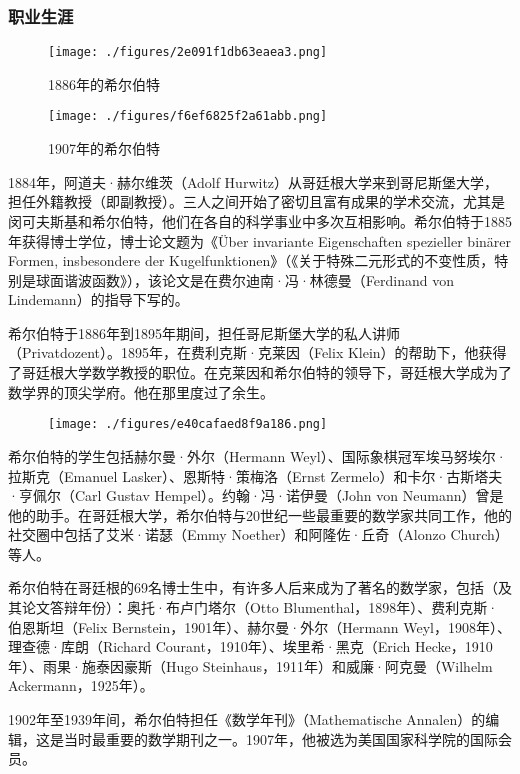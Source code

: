 \subsubsection{职业生涯}
\begin{figure}[ht]
\centering
\texttt{[image: ./figures/2e091f1db63eaea3.png]}
\caption{1886年的希尔伯特} \label{fig_David_2}
\end{figure}
\begin{figure}[ht]
\centering
\texttt{[image: ./figures/f6ef6825f2a61abb.png]}
\caption{1907年的希尔伯特} \label{fig_David_3}
\end{figure}
1884年，阿道夫·赫尔维茨（Adolf Hurwitz）从哥廷根大学来到哥尼斯堡大学，担任外籍教授（即副教授）。三人之间开始了密切且富有成果的学术交流，尤其是闵可夫斯基和希尔伯特，他们在各自的科学事业中多次互相影响。希尔伯特于1885年获得博士学位，博士论文题为《Über invariante Eigenschaften spezieller binärer Formen, insbesondere der Kugelfunktionen》（《关于特殊二元形式的不变性质，特别是球面谐波函数》），该论文是在费尔迪南·冯·林德曼（Ferdinand von Lindemann）的指导下写的。

希尔伯特于1886年到1895年期间，担任哥尼斯堡大学的私人讲师（Privatdozent）。1895年，在费利克斯·克莱因（Felix Klein）的帮助下，他获得了哥廷根大学数学教授的职位。在克莱因和希尔伯特的领导下，哥廷根大学成为了数学界的顶尖学府。他在那里度过了余生。


\begin{figure}[ht]
\centering
\texttt{[image: ./figures/e40cafaed8f9a186.png]}
\caption{} \label{fig_David_4}
\end{figure}
希尔伯特的学生包括赫尔曼·外尔（Hermann Weyl）、国际象棋冠军埃马努埃尔·拉斯克（Emanuel Lasker）、恩斯特·策梅洛（Ernst Zermelo）和卡尔·古斯塔夫·亨佩尔（Carl Gustav Hempel）。约翰·冯·诺伊曼（John von Neumann）曾是他的助手。在哥廷根大学，希尔伯特与20世纪一些最重要的数学家共同工作，他的社交圈中包括了艾米·诺瑟（Emmy Noether）和阿隆佐·丘奇（Alonzo Church）等人。

希尔伯特在哥廷根的69名博士生中，有许多人后来成为了著名的数学家，包括（及其论文答辩年份）：奥托·布卢门塔尔（Otto Blumenthal，1898年）、费利克斯·伯恩斯坦（Felix Bernstein，1901年）、赫尔曼·外尔（Hermann Weyl，1908年）、理查德·库朗（Richard Courant，1910年）、埃里希·黑克（Erich Hecke，1910年）、雨果·施泰因豪斯（Hugo Steinhaus，1911年）和威廉·阿克曼（Wilhelm Ackermann，1925年）。  

1902年至1939年间，希尔伯特担任《数学年刊》（Mathematische Annalen）的编辑，这是当时最重要的数学期刊之一。1907年，他被选为美国国家科学院的国际会员。